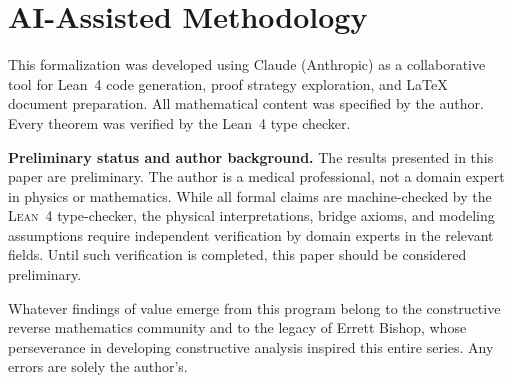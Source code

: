 \documentclass[11pt,a4paper]{article}
\theoremstyle{plain}
\theoremstyle{definition}
\newcommand{\Lean}{\textsc{Lean~4}}
\begin{document}
\section{AI-Assisted Methodology}\label{sec:ai}

This formalization was developed using Claude (Anthropic) as a
collaborative tool for Lean~4 code generation, proof strategy
exploration, and \LaTeX{} document preparation.  All mathematical
content was specified by the author.  Every theorem was verified
by the Lean~4 type checker.

\medskip\noindent
\textbf{Preliminary status and author background.}
The results presented in this paper are preliminary.  The author is a medical
professional, not a domain expert in physics or mathematics.  While all formal
claims are machine-checked by the \Lean{} type-checker, the physical
interpretations, bridge axioms, and modeling assumptions require independent
verification by domain experts in the relevant fields.  Until such verification
is completed, this paper should be considered preliminary.

\medskip\noindent
Whatever findings of value emerge from this program belong to the
constructive reverse mathematics community and to the legacy of Errett Bishop,
whose perseverance in developing constructive analysis inspired this entire
series.  Any errors are solely the author's.
\end{document}
